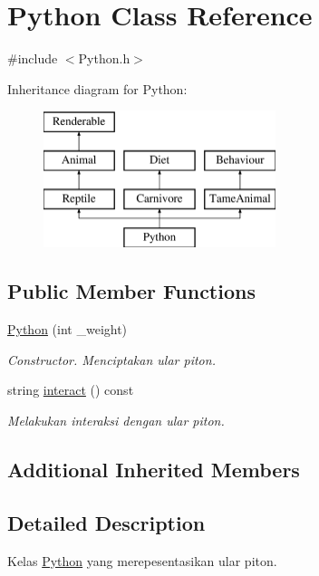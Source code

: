 \hypertarget{classPython}{\section{Python Class Reference}
\label{classPython}
}


{\ttfamily \#include $<$Python.\+h$>$}

Inheritance diagram for Python\+:\begin{figure}[H]
\begin{center}
\leavevmode
\includegraphics[height=4.000000cm]{classPython}
\end{center}
\end{figure}
\subsection*{Public Member Functions}
\begin{DoxyCompactItemize}
\item 
\hypertarget{classPython_a409f3fffc3c217bf9794c9302d15ad7d}{\hyperlink{classPython_a409f3fffc3c217bf9794c9302d15ad7d}{Python} (int \+\_\+weight)}\label{classPython_a409f3fffc3c217bf9794c9302d15ad7d}

\begin{DoxyCompactList}\small\item\em Constructor. Menciptakan ular piton. \end{DoxyCompactList}\item 
string \hyperlink{classPython_a3eeadfb5db50b6332a36962a2c3fef8a}{interact} () const 
\begin{DoxyCompactList}\small\item\em Melakukan interaksi dengan ular piton. \end{DoxyCompactList}\end{DoxyCompactItemize}
\subsection*{Additional Inherited Members}


\subsection{Detailed Description}
Kelas \hyperlink{classPython}{Python} yang merepesentasikan ular piton. 

